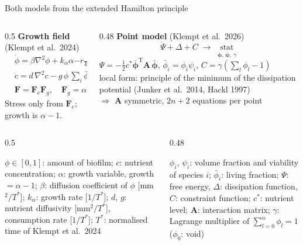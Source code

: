 \documentclass[aspectratio=169,11pt]{beamer}
\newcommand{\cbox}[3]{\colorbox{#1!8}{\parbox[t][#2][t]{\dimexpr\linewidth-2\fboxsep}{\raggedright #3}}}
\newcommand{\fterm}{\ensuremath{-r\tfrac{c}{k+c}\,\mathbf n_c\cdot\nabla \phi}}
\begin{document}
\begin{frame}{Both models from the extended Hamilton principle}
\begin{columns}[T]
\begin{column}{0.5\textwidth}
\textbf{Growth field} (Klempt et al.\ 2024)
\[
\begin{aligned}
&\dot\phi=\beta\nabla^2\phi+k_\alpha\alpha\fterm\\
&\dot c=d\,\nabla^2c-g\,\phi\,\textstyle\sum_i\bar\phi_i\,c,\qquad \dot\alpha=k_\alpha\phi\\
&\mathbf F=\mathbf F_e\mathbf F_g,\quad \mathbf F_g=\alpha\mathbf I,\quad \alpha(0)=1
\end{aligned}
\]
Stress only from $\mathbf F_e$; growth is $\alpha-1$.
\end{column}
\begin{column}{0.48\textwidth}
\textbf{Point model} (Klempt et al.\ 2026)
\[
\dot\Psi+\Delta+C\;\to\;\operatorname*{stat}_{\dot{\bm\phi},\,\dot{\bm\psi},\,\gamma}
\]
$\Psi=-\tfrac12c^*\bar{\bm\phi}^{\mathrm T}\mathbf A\,\bar{\bm\phi}$,
$\bar\phi_i=\phi_i\psi_i$, $C=\gamma(\sum_l\phi_l-1)$\\[2pt]
local form: principle of the minimum of the
dissipation potential (Junker et al.\ 2014, Hackl 1997)\\[2pt]
$\Rightarrow$ $\mathbf A$ symmetric, $2n+2$ equations per point
\end{column}
\end{columns}
\vfill
\begin{columns}[T]
\begin{column}{0.5\textwidth}
\cbox{p2}{1.6cm}{\scriptsize $\phi\in[0,1]$: amount of biofilm; $c$: nutrient concentration;
$\alpha$: growth variable, growth $=\alpha-1$; $\beta$: diffusion coefficient of $\phi$ [mm$^2/T^*$];
$k_\alpha$: growth rate [$1/T^*$]; $d$, $g$: nutrient diffusivity [mm$^2/T^*$], consumption rate [$1/T^*$];
$T^*$: normalised time of Klempt et al.\ 2024}
\end{column}
\begin{column}{0.48\textwidth}
\cbox{p1}{1.6cm}{\scriptsize $\phi_i$, $\psi_i$: volume fraction and viability of species $i$;
$\bar\phi_i$: living fraction; $\Psi$: free energy, $\Delta$: dissipation function,
$C$: constraint function; $c^*$: nutrient level; $\mathbf A$: interaction matrix;
$\gamma$: Lagrange multiplier of $\sum_{l=0}^n\phi_l=1$ ($\phi_0$: void)}
\end{column}
\end{columns}

\end{frame}
\end{document}
